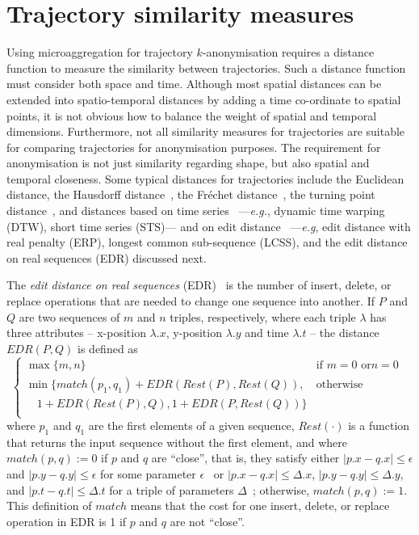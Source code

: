 \section{Trajectory similarity measures}
\label{sec:relworkdistances}

Using microaggregation
for trajectory $k$-anonymisation requires a distance function to measure
the similarity between trajectories.
Such a distance function must consider both space and time.
Although most spatial distances
can be extended into spatio-temporal distances by adding
a time co-ordinate to spatial points,
it is not obvious how to
balance the weight of spatial and temporal
dimensions.
Furthermore, not all similarity measures for trajectories are
suitable for comparing trajectories for anonymisation purposes.
The requirement for anonymisation is not just similarity regarding shape, but
also spatial and temporal closeness. Some typical distances for
trajectories
include the Euclidean distance, the Hausdorff distance~\cite{shonkwiler91},
the Fr\'echet distance~\cite{alt95}, the turning point distance~\cite{arkin91},
and distances based on time series~\cite{liao05}
---{\em e.g.}, dynamic time warping (DTW), short
time series (STS)--- and on edit distance~\cite{chen05}
---{\em e.g}, edit distance
with real penalty (ERP), longest common sub-sequence (LCSS), and the edit
distance on real sequences (EDR) discussed next.

The \emph{edit distance on real sequences} (EDR)~\cite{chen05}
is the number of insert, delete, or replace operations
that are needed to change one sequence into another.
If $P$ and $Q$ are two sequences
of $m$ and $n$ triples, respectively, where each triple $\lambda$ has three
attributes -- x-position $\lambda.x$, y-position $\lambda.y$ and time
$\lambda.t$ --
the distance $EDR(P,Q)$ is defined as
\[\begin{cases} \max\{m,n\} & \text{if } m=0 \text{ or
} n=0 \\
\min \{ match(p_1,q_1) + EDR(Rest(P),Rest(Q)), & \text{otherwise}
\\ \quad 1 + EDR(Rest(P),Q), 1 + EDR(P,Rest(Q)) \} & \\ \end{cases} \enspace\]
 where $p_1$ and $q_1$ are the first elements of a given sequence,
$Rest(\cdot)$ is a function that returns the input sequence without the
first element, and where $match(p,q) := 0$ if $p$ and $q$ are ``close'',
that is, they satisfy either
$|p.x-q.x| \le \epsilon$ and $|p.y-q.y| \le \epsilon$ for some
parameter $\epsilon$~\cite{chen05} or  $|p.x-q.x| \le \Delta.x$,
$|p.y-q.y| \le \Delta.y$, and $|p.t-q.t| \le \Delta.t$ for a triple of
parameters $\Delta$~\cite{abul10}; otherwise, $match(p,q) := 1$. This
definition of $match$ means that the cost for one insert, delete, or replace
operation in EDR is 1 if $p$ and $q$ are not ``close''.

